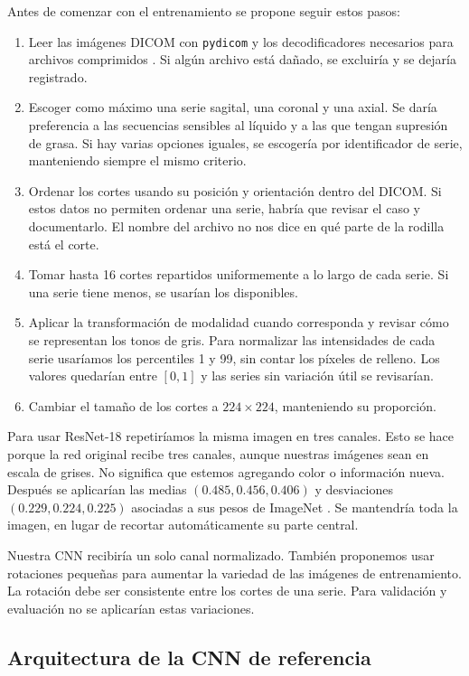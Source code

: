 \documentclass[eng]{ajceam-class}
\begin{document}
Antes de comenzar con el entrenamiento se propone seguir estos pasos:
\begin{enumerate}
    \item Leer las imágenes DICOM con \texttt{pydicom} y los decodificadores necesarios para archivos comprimidos \cite{pydicompixels}. Si algún archivo está dañado, se excluiría y se dejaría registrado.
    \item Escoger como máximo una serie sagital, una coronal y una axial. Se daría preferencia a las secuencias sensibles al líquido y a las que tengan supresión de grasa. Si hay varias opciones iguales, se escogería por identificador de serie, manteniendo siempre el mismo criterio.
    \item Ordenar los cortes usando su posición y orientación dentro del DICOM. Si estos datos no permiten ordenar una serie, habría que revisar el caso y documentarlo. El nombre del archivo no nos dice en qué parte de la rodilla está el corte.
    \item Tomar hasta 16 cortes repartidos uniformemente a lo largo de cada serie. Si una serie tiene menos, se usarían los disponibles.
    \item Aplicar la transformación de modalidad cuando corresponda y revisar cómo se representan los tonos de gris. Para normalizar las intensidades de cada serie usaríamos los percentiles 1 y 99, sin contar los píxeles de relleno. Los valores quedarían entre $[0,1]$ y las series sin variación útil se revisarían.
    \item Cambiar el tamaño de los cortes a $224\times224$, manteniendo su proporción.
\end{enumerate}

Para usar ResNet-18 repetiríamos la misma imagen en tres canales. Esto se hace porque la red original recibe tres canales, aunque nuestras imágenes sean en escala de grises. No significa que estemos agregando color o información nueva. Después se aplicarían las medias $(0.485,0.456,0.406)$ y desviaciones $(0.229,0.224,0.225)$ asociadas a sus pesos de ImageNet \cite{torchresnet}. Se mantendría toda la imagen, en lugar de recortar automáticamente su parte central.

Nuestra CNN recibiría un solo canal normalizado. También proponemos usar rotaciones pequeñas para aumentar la variedad de las imágenes de entrenamiento. La rotación debe ser consistente entre los cortes de una serie. Para validación y evaluación no se aplicarían estas variaciones.

\subsection{Arquitectura de la CNN de referencia}
\end{document}
